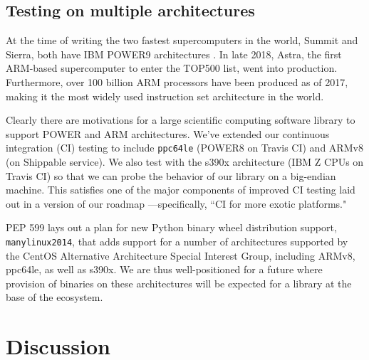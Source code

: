 \subsection{Testing on multiple architectures}

At the time of writing the two fastest supercomputers in the
world, Summit and Sierra, both have IBM POWER9 architectures
\cite{top500nov2019}. In late 2018, Astra, the first ARM-based
supercomputer to enter the TOP500 list, went into production\cite{
astra-wiki}. Furthermore, over 100 billion ARM processors have been
produced as of 2017\cite{arm-architecture}, making it the most 
widely used instruction set architecture in the world.

Clearly there are motivations for a large scientific computing
software library to support POWER and ARM architectures. We've extended
our continuous integration (CI) testing to include \texttt{ppc64le}
(POWER8 on Travis CI) and ARMv8 (on Shippable service). We also test
with the s390x architecture (IBM Z CPUs on Travis CI) so that we
can probe the behavior of our library on a big-endian machine.
This satisfies one of the major components of
improved CI testing laid out in a version of our roadmap
\cite{numpy-roadmap}---specifically, ``CI for more exotic
platforms."

PEP 599\cite{PEP599} lays out a plan for new Python binary wheel
distribution support, \texttt{manylinux2014}, that adds
support for a number of architectures supported by the CentOS
Alternative Architecture Special Interest Group, including
ARMv8, ppc64le, as well as s390x. We are thus well-positioned
for a future where provision of binaries on these architectures
will be expected for a library at the base of the ecosystem.


\section{Discussion}


